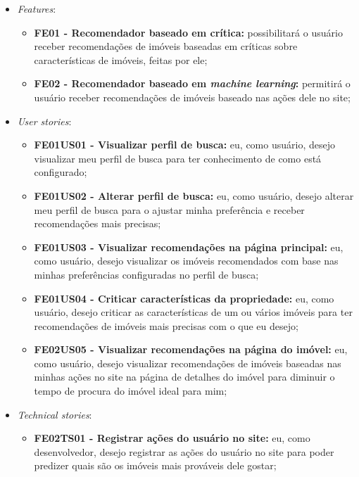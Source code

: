 \begin{itemize}
    \item \textit{Features}:
    \begin{itemize}
        \item \textbf{FE01 - Recomendador baseado em crítica:} possibilitará o usuário receber recomendações de imóveis baseadas em críticas sobre características de imóveis, feitas por ele;

        \item \textbf{FE02 - Recomendador baseado em \textit{machine learning}:} permitirá o usuário receber recomendações de imóveis baseado nas ações dele no site;
    \end{itemize}
    
    \item \textit{User stories}:
    \begin{itemize}
        \item \textbf{FE01US01 - Visualizar perfil de busca:} eu, como usuário, desejo visualizar meu perfil de busca para ter conhecimento de como está configurado;
        
        \item \textbf{FE01US02 - Alterar perfil de busca:} eu, como usuário, desejo alterar meu perfil de busca para o ajustar minha preferência e receber recomendações mais precisas;
        
        \item \textbf{FE01US03 - Visualizar recomendações na página principal:} eu, como usuário, desejo visualizar os imóveis recomendados com base nas minhas preferências configuradas no perfil de busca;
        
        \item \textbf{FE01US04 - Criticar características da propriedade:} eu, como usuário, desejo criticar as características de um ou vários imóveis para ter recomendações de imóveis mais precisas com o que eu desejo;
        
        \item \textbf{FE02US05 - Visualizar recomendações na página do imóvel:} eu, como usuário, desejo visualizar recomendações de imóveis baseadas nas minhas ações no site na página de detalhes do imóvel para diminuir o tempo de procura do imóvel ideal para mim;
    \end{itemize}
    
    \item \textit{Technical stories}:
    \begin{itemize}
        \item \textbf{FE02TS01 - Registrar ações do usuário no site:} eu, como desenvolvedor, desejo registrar as ações do usuário no site para poder predizer quais são os imóveis mais prováveis dele gostar;
    \end{itemize}
\end{itemize}

